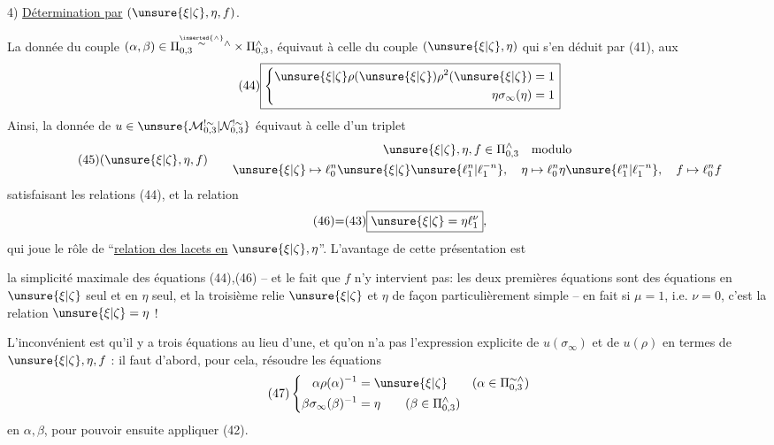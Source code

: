 4) \uline{Détermination par} $(\unsure{\xi|\zeta},\eta,f)$.

La donnée du couple $(\alpha,\beta)\in\Pi_{0,3}^{\overset{\inserted{\wedge}}{\sim}\wedge}\times\Pi_{0,3}^{\wedge}$, équivaut à celle du couple $(\unsure{\xi|\zeta},\eta)$ qui s'en déduit par (41),  aux 
\[
\tag{44}
\boxed{\left\{\begin{aligned}
\unsure{\xi|\zeta}\rho(\unsure{\xi|\zeta})\rho^2(\unsure{\xi|\zeta})&=1\\
\eta\sigma_\infty(\eta)&=1
\end{aligned}\right.}
\]
Ainsi, la donnée de $u\in\unsure{\mathcal{M}_{0,3}^{!\sim}|\mathcal{N}_{0,3}^{!\sim}}$ équivaut à celle d'un triplet
\[
\tag{45}
(\unsure{\xi|\zeta},\eta,f)\qquad
\begin{gathered}
\unsure{\xi|\zeta},\eta,f\in\Pi_{0,3}^{\wedge}\quad\text{modulo}\\
\unsure{\xi|\zeta}\mapsto\ell_0^n\unsure{\xi|\zeta}\unsure{\ell_1^n|\ell_1^{-n}},\quad
\eta\mapsto\ell_0^n\eta\unsure{\ell_1^n|\ell_1^{-n}},\quad
f\mapsto\ell_0^n f
\end{gathered}
\]
satisfaisant les relations (44), et la relation
\[
\tag*{(46)=(43)}
\boxed{\unsure{\xi|\zeta}=\eta\ell_1^\nu},
\]
qui joue le rôle de ``\uline{relation des lacets en} $\unsure{\xi|\zeta},\eta$''. L'avantage de cette présentation est


la simplicité maximale des équations (44),(46) -- et le fait que $f$ n'y intervient pas:  les deux premières équations sont des équations en $\unsure{\xi|\zeta}$ seul et en $\eta$ seul, et la troisième relie $\unsure{\xi|\zeta}$ et $\eta$ de façon particulièrement simple -- en fait si $\mu=1$, i.e. $\nu=0$, c'est la relation $\unsure{\xi|\zeta}=\eta$ !

L'inconvénient est qu'il y a trois équations au lieu d'une, et qu'on n'a pas l'expression explicite de $u(\sigma_\infty)$ et de $u(\rho)$ en termes de $\unsure{\xi|\zeta},\eta,f$ : il faut d'abord, pour cela, résoudre les équations
\[
\tag{47}
\left\{\begin{aligned}
\alpha\rho(\alpha)^{-1}&=\unsure{\xi|\zeta}\qquad(\alpha\in\Pi_{0,3}^{\sim\wedge})\\
\beta\sigma_\infty(\beta)^{-1}&=\eta\qquad(\beta\in\Pi_{0,3}^{\wedge})
\end{aligned}\right.
\]
en $\alpha,\beta$, pour pouvoir ensuite appliquer (42).

